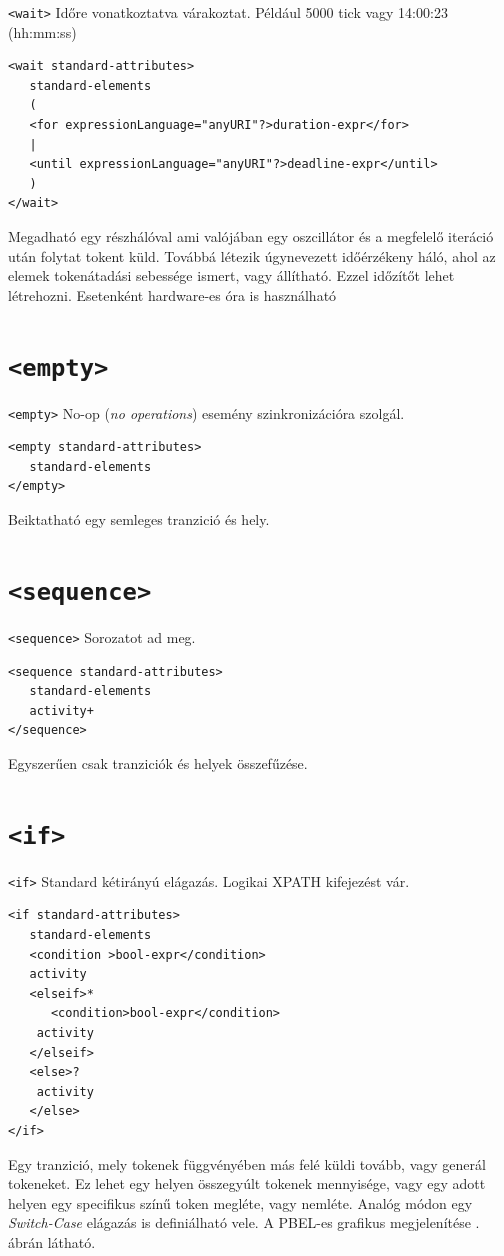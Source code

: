 \texttt{<wait>} Időre vonatkoztatva várakoztat. Például 5000 tick vagy 14:00:23 (hh:mm:ss)
\begin{verbatim} 
<wait standard-attributes>
   standard-elements
   (
   <for expressionLanguage="anyURI"?>duration-expr</for>
   |
   <until expressionLanguage="anyURI"?>deadline-expr</until>
   )
</wait>
\end{verbatim}
Megadható egy részhálóval ami valójában egy oszcillátor és a megfelelő iteráció után folytat tokent küld. Továbbá létezik úgynevezett időérzékeny háló, ahol az elemek tokenátadási sebessége ismert, vagy állítható. Ezzel időzítőt lehet létrehozni. Esetenként hardware-es óra is használható

\section{\texttt{<empty>}}
\texttt{<empty>} No-op (\textit{no operations}) esemény szinkronizációra szolgál.
\begin{verbatim}
<empty standard-attributes>
   standard-elements
</empty>
\end{verbatim}
Beiktatható egy semleges tranzició és hely.

\section{\texttt{<sequence>}}

\texttt{<sequence>} Sorozatot ad meg.
\begin{verbatim}
<sequence standard-attributes>
   standard-elements
   activity+
</sequence>
\end{verbatim}
Egyszerűen csak tranziciók és helyek összefűzése. 

\section{\texttt{<if>}}

\texttt{<if>} Standard kétirányú elágazás. Logikai XPATH kifejezést vár. 
\begin{verbatim}
<if standard-attributes>
   standard-elements
   <condition >bool-expr</condition>
   activity
   <elseif>*
      <condition>bool-expr</condition>
  	activity
   </elseif>
   <else>?
  	activity
   </else>
</if>
\end{verbatim}
Egy tranzició, mely tokenek függvényében más felé küldi tovább, vagy generál tokeneket. Ez lehet egy helyen összegyúlt tokenek mennyisége, vagy egy adott helyen egy specifikus színű token megléte, vagy nemléte. Analóg módon egy \textit{Switch-Case} elágazás is definiálható vele.
A PBEL-es grafikus megjelenítése . ábrán látható.

